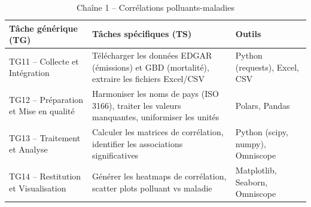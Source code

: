 \documentclass[11pt,a4paper]{article}
\begin{document}
\begin{table}[H]
\centering
\caption{Chaîne 1 -- Corrélations polluants-maladies}
\begin{tabular}{p{3.5cm}p{5.5cm}p{4.5cm}}
\toprule
\textbf{Tâche générique (TG)} & \textbf{Tâches spécifiques (TS)} & \textbf{Outils} \\
\midrule
TG11 -- Collecte et Intégration & Télécharger les données EDGAR (émissions) et GBD (mortalité), extraire les fichiers Excel/CSV & Python (requests), Excel, CSV \\
\midrule
TG12 -- Préparation et Mise en qualité & Harmoniser les noms de pays (ISO 3166), traiter les valeurs manquantes, uniformiser les unités & Polars, Pandas \\
\midrule
TG13 -- Traitement et Analyse & Calculer les matrices de corrélation, identifier les associations significatives & Python (scipy, numpy), Omniscope \\
\midrule
TG14 -- Restitution et Visualisation & Générer les heatmaps de corrélation, scatter plots polluant vs maladie & Matplotlib, Seaborn, Omniscope \\
\bottomrule
\end{tabular}
\end{table}
\end{document}
